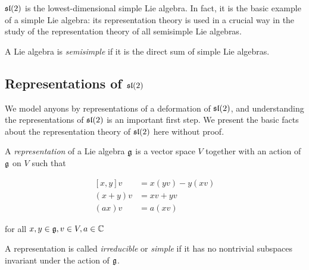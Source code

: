 $\mathfrak{sl}(2)$ is the lowest-dimensional simple Lie algebra. In fact, it is the
basic example of a simple Lie algebra: its representation theory is used in a
crucial way in the study of the representation theory of all semisimple Lie
algebras.

\begin{defn}
    A Lie algebra is \emph{semisimple} if it is the direct sum of simple Lie
    algebras.
\end{defn}

\subsection{Representations of $\mathfrak{sl}(2)$}
\label{subsection:RepsOfSL2}
We model anyons by representations of a deformation of $\mathfrak{sl}(2)$, and
understanding the representations of $\mathfrak{sl}(2)$ is an important first step. We
present the basic facts about the representation theory of $\mathfrak{sl}(2)$ here
without proof.

A \emph{representation} of a Lie algebra $\mathfrak{g}$ is a vector space $V$
together with an action of $\mathfrak{g}$ on $V$ such that 

\begin{align*}
    \left[ x,y \right] v &= x(yv) - y(xv) \\
    (x+y)v &= xv + yv \\
    (ax)v &= a(xv)
\end{align*}

for all $x,y \in \mathfrak{g}, v \in V, a \in \mathbb{C}$

A representation is called \emph{irreducible} or \emph{simple} if it has no
nontrivial subspaces invariant under the action of $\mathfrak{g}$.

